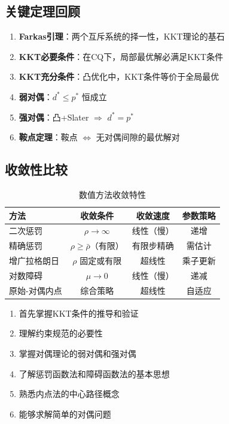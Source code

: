 \subsection{关键定理回顾}

\begin{enumerate}
    \item \textbf{Farkas引理}：两个互斥系统的择一性，KKT理论的基石
    
    \item \textbf{KKT必要条件}：在CQ下，局部最优解必满足KKT条件
    
    \item \textbf{KKT充分条件}：凸优化中，KKT条件等价于全局最优
    
    \item \textbf{弱对偶}：$d^* \leq p^*$ 恒成立
    
    \item \textbf{强对偶}：凸+Slater $\Rightarrow$ $d^* = p^*$
    
    \item \textbf{鞍点定理}：鞍点 $\Leftrightarrow$ 无对偶间隙的最优解对
\end{enumerate}

\subsection{收敛性比较}

\begin{table}[H]
\centering
\caption{数值方法收敛特性}
\begin{tabular}{@{}lccc@{}}
\toprule
\textbf{方法} & \textbf{收敛条件} & \textbf{收敛速度} & \textbf{参数策略} \\
\midrule
二次惩罚 & $\rho \to \infty$ & 线性（慢） & 递增 \\
精确惩罚 & $\rho \geq \bar{\rho}$（有限）& 有限步精确 & 需估计 \\
增广拉格朗日 & $\rho$ 固定或有限 & 超线性 & 乘子更新 \\
对数障碍 & $\mu \to 0$ & 线性（慢）& 递减 \\
原始-对偶内点 & 综合策略 & 超线性 & 自适应 \\
\bottomrule
\end{tabular}
\end{table}

\begin{notebox}[学习建议]
\begin{enumerate}
    \item 首先掌握KKT条件的推导和验证
    \item 理解约束规范的必要性
    \item 掌握对偶理论的弱对偶和强对偶
    \item 了解惩罚函数法和障碍函数法的基本思想
    \item 熟悉内点法的中心路径概念
    \item 能够求解简单的对偶问题
\end{enumerate}
\end{notebox}

\newpage

